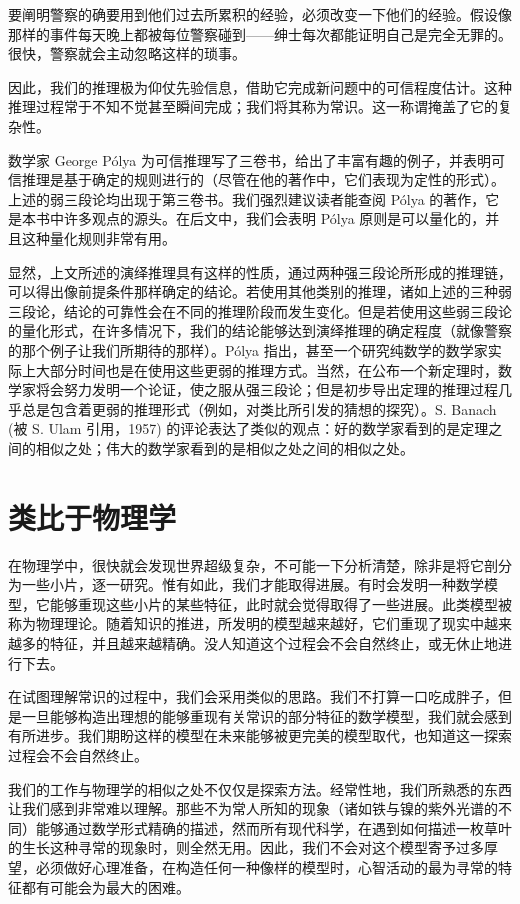 要阐明警察的确要用到他们过去所累积的经验，必须改变一下他们的经验。假设像那样的事件每天晚上都被每位警察碰到——绅士每次都能证明自己是完全无罪的。很快，警察就会主动忽略这样的琐事。

因此，我们的推理极为仰仗先验信息，借助它完成新问题中的可信程度估计。这种推理过程常于不知不觉甚至瞬间完成；我们将其称为常识。这一称谓掩盖了它的复杂性。

数学家 George Pólya 为可信推理写了三卷书，给出了丰富有趣的例子，并表明可信推理是基于确定的规则进行的（尽管在他的著作中，它们表现为定性的形式）。上述的弱三段论均出现于第三卷书。我们强烈建议读者能查阅 Pólya 的著作，它是本书中许多观点的源头。在后文中，我们会表明 Pólya 原则是可以量化的，并且这种量化规则非常有用。

显然，上文所述的演绎推理具有这样的性质，通过两种强三段论所形成的推理链，可以得出像前提条件那样确定的结论。若使用其他类别的推理，诸如上述的三种弱三段论，结论的可靠性会在不同的推理阶段而发生变化。但是若使用这些弱三段论的量化形式，在许多情况下，我们的结论能够达到演绎推理的确定程度（就像警察的那个例子让我们所期待的那样）。Pólya 指出，甚至一个研究纯数学的数学家实际上大部分时间也是在使用这些更弱的推理方式。当然，在公布一个新定理时，数学家将会努力发明一个论证，使之服从强三段论；但是初步导出定理的推理过程几乎总是包含着更弱的推理形式（例如，对类比所引发的猜想的探究）。S. Banach (被 S. Ulam 引用，1957) 的评论表达了类似的观点：好的数学家看到的是定理之间的相似之处；伟大的数学家看到的是相似之处之间的相似之处。

\section{类比于物理学}

在物理学中，很快就会发现世界超级复杂，不可能一下分析清楚，除非是将它剖分为一些小片，逐一研究。惟有如此，我们才能取得进展。有时会发明一种数学模型，它能够重现这些小片的某些特征，此时就会觉得取得了一些进展。此类模型被称为物理理论。随着知识的推进，所发明的模型越来越好，它们重现了现实中越来越多的特征，并且越来越精确。没人知道这个过程会不会自然终止，或无休止地进行下去。

在试图理解常识的过程中，我们会采用类似的思路。我们不打算一口吃成胖子，但是一旦能够构造出理想的能够重现有关常识的部分特征的数学模型，我们就会感到有所进步。我们期盼这样的模型在未来能够被更完美的模型取代，也知道这一探索过程会不会自然终止。

我们的工作与物理学的相似之处不仅仅是探索方法。经常性地，我们所熟悉的东西让我们感到非常难以理解。那些不为常人所知的现象（诸如铁与镍的紫外光谱的不同）能够通过数学形式精确的描述，然而所有现代科学，在遇到如何描述一枚草叶的生长这种寻常的现象时，则全然无用。因此，我们不会对这个模型寄予过多厚望，必须做好心理准备，在构造任何一种像样的模型时，心智活动的最为寻常的特征都有可能会为最大的困难。

